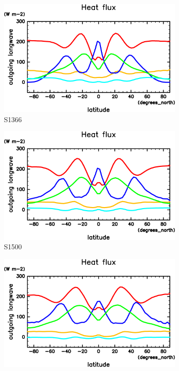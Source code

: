 \documentclass[body]{subfiles}
\begin{document}
\begin{figure}[t]
	\centering
	\begin{subfigure}{.4\textwidth}
		\centering
		\includegraphics[width=\columnwidth]{S1366/HeatFlx,time=14600:14965-crop-rotate.pdf}
		\caption{S1366}\label{EnFlx南北分布S1366}
	\end{subfigure}
	\begin{subfigure}{.4\textwidth}
		\centering
		\includegraphics[width=\columnwidth]{S1500/HeatFlx,time=3650:4015-crop-rotate.pdf}
		\caption{S1500}\label{EnFlx南北分布S1500}
	\end{subfigure}
	\begin{subfigure}{.4\textwidth}
		\centering
		\includegraphics[width=\columnwidth]{S1600/HeatFlx,time=3650:4015-crop-rotate.pdf}

\end{subfigure}
\end{figure}
\end{document}
